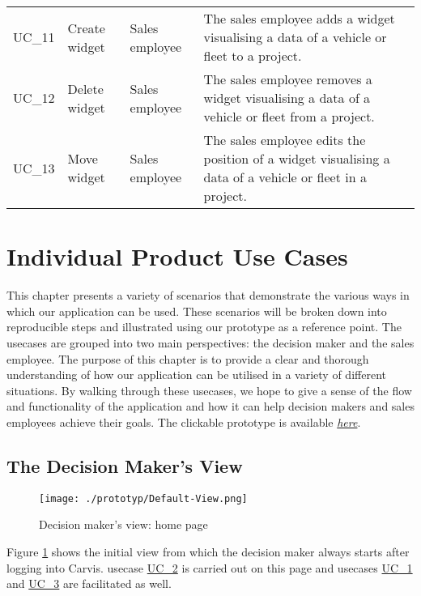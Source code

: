 \begin{footnotesize}
\begin{longtable}[i i i L]{ p{} p{} p{} p{} }
    \hypertarget{Ref:UC11}{UC\_11} & Create \gls{widget} & Sales employee & The sales employee adds a \gls{widget} visualising a \gls{data} of a vehicle or fleet to a project.\\
    \hypertarget{Ref:UC12}{UC\_12} & Delete \gls{widget} & Sales employee & The sales employee removes a \gls{widget} visualising a \gls{data} of a vehicle or fleet from a project.\\
    \hypertarget{Ref:UC13}{UC\_13} & Move \gls{widget} & Sales employee & The sales employee edits the position of a \gls{widget} visualising a \gls{data} of a vehicle or fleet in a project.\\
    \bottomrule
  \end{longtable}
\end{footnotesize}
\rmfamily

\section{Individual Product Use Cases}
This chapter presents a variety of scenarios that demonstrate the various ways in which our application can be used. These scenarios will be broken down into reproducible steps and illustrated using our prototype as a reference point. The \glspl{usecase} are grouped into two main perspectives: the decision maker and the sales employee. The purpose of this chapter is to provide a clear and thorough understanding of how our application can be utilised in a variety of different situations. By walking through these \glspl{usecase}, we hope to give a sense of the flow and functionality of the application and how it can help decision makers and sales employees achieve their goals.
The clickable prototype is available \href{https://www.figma.com/proto/QnshySDvR2A5jazPugjKq7/Carvis?scaling=scale-down&show-proto-sidebar=1&node-id=560%3A2807&starting-point-node-id=709%3A5104}{\emph{here}}.

\subsection{The Decision Maker's View}
\begin{figure}[H]
  \centering
  \texttt{[image: ./prototyp/Default-View.png]}
  \caption{Decision maker's view: home page}
  \label{DecisionMaker:Homepage}
\end{figure}

Figure \ref{DecisionMaker:Homepage} shows the initial view from which the decision maker always starts after logging into Carvis. \Gls{usecase} \hyperlink{Ref:UC2}{UC\_2} is carried out on this page and \glspl{usecase} \hyperlink{Ref:UC1}{UC\_1} and \hyperlink{Ref:UC3}{UC\_3} are facilitated as well. 


